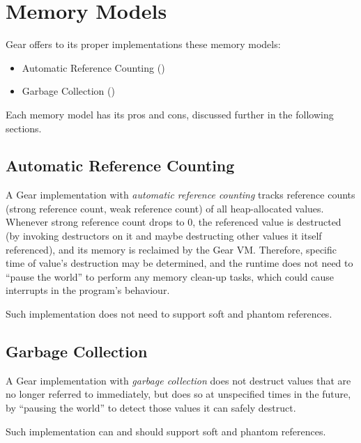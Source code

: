
\chapter{Memory Models}
\label{sec:memory-models}

\minitoc

Gear offers to its proper implementations these memory models:
\begin{itemize}
  \item Automatic Reference Counting ()
  \item Garbage Collection ()
\end{itemize}

Each memory model has its pros and cons, discussed further in the following sections. 






\section{Automatic Reference Counting}
\label{sec:arc-memory-model}

A Gear implementation with {\em automatic reference counting} tracks reference counts (strong reference count, weak reference count) of all heap-allocated values. Whenever strong reference count drops to 0, the referenced value is destructed (by invoking destructors on it and maybe destructing other values it itself referenced), and its memory is reclaimed by the Gear VM. Therefore, specific time of value's destruction may be determined, and the runtime does not need to ``pause the world'' to perform any memory clean-up tasks, which could cause interrupts in the program's behaviour. 

Such implementation does not need to support soft and phantom references. 









\section{Garbage Collection}
\label{sec:gc-memory-model}

A Gear implementation with {\em garbage collection} does not destruct values that are no longer referred to immediately, but does so at unspecified times in the future, by ``pausing the world'' to detect those values it can safely destruct. 

Such implementation can and should support soft and phantom references. 













